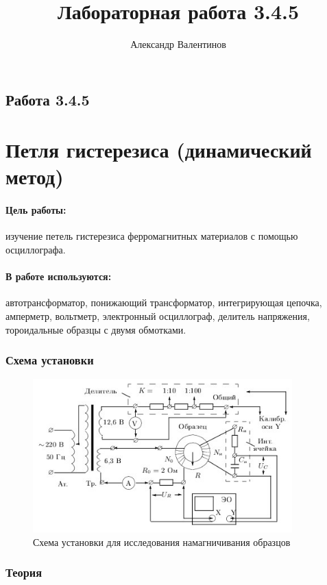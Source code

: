 \documentclass{article}
\author{Александр Валентинов}
\title{Лабораторная работа 3.4.5}
\begin{document}
   \subsection*{Работа 3.4.5}
   \section*{Петля гистерезиса (динамический метод)}
   
   \paragraph{Цель работы:} изучение петель гистерезиса ферромагнитных материалов с помощью осциллографа.
   
   \paragraph{В работе используются:} автотрансформатор, понижающий трансформатор, интегрирующая цепочка, амперметр, вольтметр, электронный осциллограф, делитель напряжения, тороидальные образцы с двумя обмотками.

   \subsubsection*{Схема установки}
   \begin{figure}[h]
   \centering
   \includegraphics[width=10cm]{fig1.jpg} 
   \caption{Схема установки для исследования намагничивания образцов} 
   \label{fig.1} 
   \end{figure}

   \subsubsection*{Теория}
   
\end{document}
